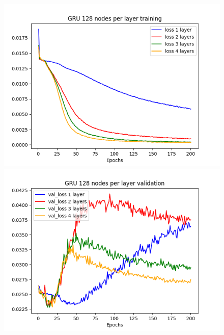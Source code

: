 \documentclass[11pt]
{article}
\begin{document}
\begin{figure}[H]
\begin{minipage}[b]{0.33\linewidth}
		\includegraphics[width=\linewidth]{../TESTS_RESULTS/GRU_tests/plots/128_training.png} 
	\end{minipage}%
	\begin{minipage}[b]{0.33\linewidth}
		\centering
		\includegraphics[width=\linewidth]{../TESTS_RESULTS/GRU_tests/plots/128_validation.png} 
	\end{minipage} 
	\hspace*{-2cm}  
	\begin{minipage}[b]{0.33\linewidth}
		\centering

\end{minipage}
\end{figure}
\end{document}

